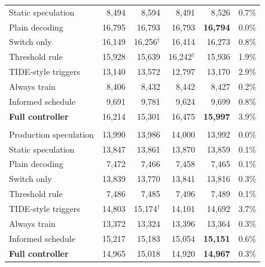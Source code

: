 \begin{tabular}{@{}lrrrrr@{}}
Static speculation
& 8{,}494 & 8{,}594 & 8{,}491
& 8{,}526 & 0.7\% \\

Plain decoding
& 16{,}795 & 16{,}793 & 16{,}793
& \cellcolor{tabBest}\textbf{16{,}794}
& 0.0\% \\

Switch only
& 16{,}149 & 16{,}256$^\dagger$ & 16{,}414
& 16{,}273 & 0.8\% \\

Threshold rule
& 15{,}928 & 15{,}639 & 16{,}242$^\dagger$
& 15{,}936 & 1.9\% \\

TIDE-style triggers
& 13{,}140 & 13{,}572 & 12{,}797
& 13{,}170 & 2.9\% \\

Always train
& 8{,}406 & 8{,}432 & 8{,}442
& 8{,}427 & 0.2\% \\

Informed schedule
& 9{,}691 & 9{,}781 & 9{,}624
& 9{,}699 & 0.8\% \\

\rowcolor{tabFull}
\textbf{Full controller}
& 16{,}214 & 15{,}301 & 16{,}475
& \textbf{15{,}997} & 3.9\% \\

\addlinespace[4pt]

\rowcolor{tabGroup}
\multicolumn{6}{@{}l@{}}{%
  \textbf{Qwen3-30B-A3B (MoE) -- Code}
} \\

Production speculation
& 13{,}990 & 13{,}986 & 14{,}000
& 13{,}992 & 0.0\% \\

Static speculation
& 13{,}847 & 13{,}861 & 13{,}870
& 13{,}859 & 0.1\% \\

Plain decoding
& 7{,}472 & 7{,}466 & 7{,}458
& 7{,}465 & 0.1\% \\

Switch only
& 13{,}839 & 13{,}770 & 13{,}841
& 13{,}816 & 0.3\% \\

Threshold rule
& 7{,}486 & 7{,}485 & 7{,}496
& 7{,}489 & 0.1\% \\

TIDE-style triggers
& 14{,}803 & 15{,}174$^\dagger$ & 14{,}101
& 14{,}692 & 3.7\% \\

Always train
& 13{,}372 & 13{,}324 & 13{,}396
& 13{,}364 & 0.3\% \\

Informed schedule
& 15{,}217 & 15{,}183 & 15{,}054
& \cellcolor{tabBest}\textbf{15{,}151}
& 0.6\% \\

\rowcolor{tabFull}
\textbf{Full controller}
& 14{,}965 & 15{,}018 & 14{,}920
& \textbf{14{,}967} & 0.3\% \\

\bottomrule
\end{tabular}
\endgroup
